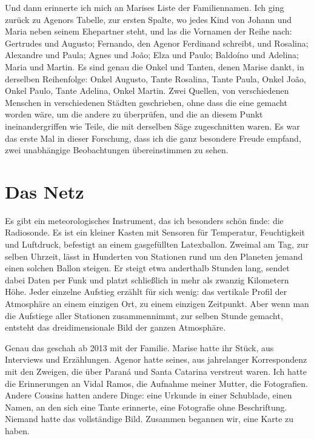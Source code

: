 \documentclass[
  ngerman,
  11pt,
  openany]{book}
\begin{document}
Und dann erinnerte ich mich an Marises Liste der Familiennamen. Ich ging
zurück zu Agenors Tabelle, zur ersten Spalte, wo jedes Kind von Johann
und Maria neben seinem Ehepartner steht, und las die Vornamen der Reihe
nach: Gertrudes und Augusto; Fernando, den Agenor Ferdinand schreibt,
und Rosalina; Alexandre und Paula; Agnes und João; Elza und Paulo;
Baldoíno und Adelina; Maria und Martin. Es sind genau die Onkel und
Tanten, denen Marise dankt, in derselben Reihenfolge: Onkel Augusto,
Tante Rosalina, Tante Paula, Onkel João, Onkel Paulo, Tante Adelina,
Onkel Martin. Zwei Quellen, von verschiedenen Menschen in verschiedenen
Städten geschrieben, ohne dass die eine gemacht worden wäre, um die
andere zu überprüfen, und die an diesem Punkt ineinandergriffen wie
Teile, die mit derselben Säge zugeschnitten waren. Es war das erste Mal
in dieser Forschung, dass ich die ganz besondere Freude empfand, zwei
unabhängige Beobachtungen übereinstimmen zu sehen.

\section{Das Netz}\label{das-netz}

Es gibt ein meteorologisches Instrument, das ich besonders schön finde:
die Radiosonde. Es ist ein kleiner Kasten mit Sensoren für Temperatur,
Feuchtigkeit und Luftdruck, befestigt an einem gasgefüllten Latexballon.
Zweimal am Tag, zur selben Uhrzeit, lässt in Hunderten von Stationen
rund um den Planeten jemand einen solchen Ballon steigen. Er steigt etwa
anderthalb Stunden lang, sendet dabei Daten per Funk und platzt
schließlich in mehr als zwanzig Kilometern Höhe. Jeder einzelne Aufstieg
erzählt für sich wenig: das vertikale Profil der Atmosphäre an einem
einzigen Ort, zu einem einzigen Zeitpunkt. Aber wenn man die Aufstiege
aller Stationen zusammennimmt, zur selben Stunde gemacht, entsteht das
dreidimensionale Bild der ganzen Atmosphäre.

Genau das geschah ab 2013 mit der Familie. Marise hatte ihr Stück, aus
Interviews und Erzählungen. Agenor hatte seines, aus jahrelanger
Korrespondenz mit den Zweigen, die über Paraná und Santa Catarina
verstreut waren. Ich hatte die Erinnerungen an Vidal Ramos, die Aufnahme
meiner Mutter, die Fotografien. Andere Cousins hatten andere Dinge: eine
Urkunde in einer Schublade, einen Namen, an den sich eine Tante
erinnerte, eine Fotografie ohne Beschriftung. Niemand hatte das
vollständige Bild. Zusammen begannen wir, eine Karte zu haben.
\end{document}
